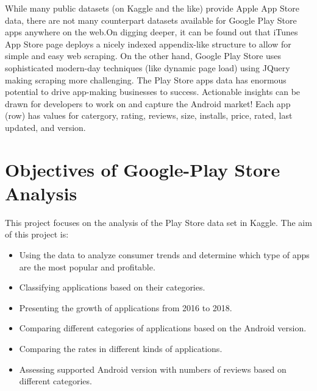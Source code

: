 While many public datasets (on Kaggle and the like) provide Apple App Store data, there are not many counterpart datasets available for Google Play Store apps anywhere on the web.On digging deeper, it can be found out that iTunes App Store page deploys a nicely indexed appendix-like structure to allow for simple and easy web scraping. On the other hand, Google Play Store uses sophisticated modern-day techniques (like dynamic page load) using JQuery making scraping more challenging.
The Play Store apps data has enormous potential to drive app-making businesses to success. Actionable insights can be drawn for developers to work on and capture the Android market!
Each app (row) has values for catergory, rating, reviews, size, installs, price, rated, last updated, and version.


\section*{Objectives of Google-Play Store Analysis}
This project focuses on the analysis of the Play Store data set in Kaggle.
The aim of this project is:
\begin{itemize}
\item Using the data to analyze consumer trends and determine which type of apps are the most popular and profitable.\\
\item Classifying applications based on their categories.\\
\item Presenting the growth of applications from 2016 to 2018.\\
\item Comparing different categories of applications based on the Android version.\\
\item Comparing the rates in different kinds of applications.\\
\item Assessing supported Android version with numbers of reviews based on different categories.\\
\end{itemize}

